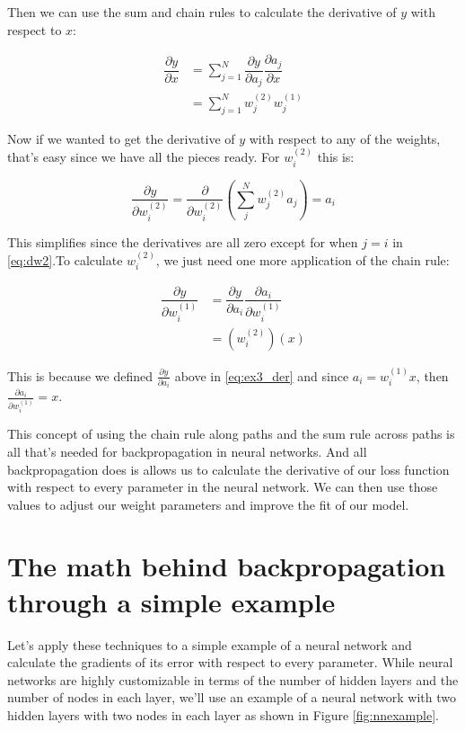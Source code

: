 \documentclass{article}
\begin{document}
Then we can use the sum and chain rules to calculate the derivative of $y$ with respect to $x$:

\begin{align}
    \dfrac{\partial y}{\partial x} &= \sum\limits_{j=1}^N  \dfrac{\partial y}{\partial a_j} \dfrac{\partial a_j}{\partial x} \label{eq:ex3_der}\\
    &= \sum\limits_{j=1}^N w_j^{(2)} w_j^{(1)}
\end{align}

Now if we wanted to get the derivative of $y$ with respect to any of the weights, that's easy since we have all the pieces ready. For $w_i^{(2)}$ this is:

\begin{equation}
    \dfrac{\partial y}{\partial w_i^{(2)}} = \dfrac{\partial}{\partial w_i^{(2)}}  \left(\sum\limits_j^N w_j^{(2)} a_j \right) = a_i
    \label{eq:dw2}
\end{equation}

This simplifies since the derivatives are all zero except for when $j=i$ in \ref{eq:dw2}.To calculate $w_i^{(2)}$, we just need one more application of the chain rule:

\begin{align}
    \dfrac{\partial y}{\partial w_i^{(1)}} &= \dfrac{\partial y}{\partial a_i} \dfrac{\partial a_i}{\partial w_i^{(1)}} \\
    &= (w_i^{(2)})(x)
\end{align}

This is because we defined $\frac{\partial y}{\partial a_i}$ above in \ref{eq:ex3_der} and since $a_i = w_i^{(1)} x$, then $\frac{\partial a_i}{\partial w_i^{(1)}} = x$.

This concept of using the chain rule along paths and the sum rule across paths is all that's needed for backpropagation in neural networks. And all backpropagation does is allows us to calculate the derivative of our loss function with respect to every parameter in the neural network. We can then use those values to adjust our weight parameters and improve the fit of our model.

\section{The math behind backpropagation through a simple example}

Let's apply these techniques to a simple example of a neural network and calculate the gradients of its error with respect to every parameter. While neural networks are highly customizable in terms of the number of hidden layers and the number of nodes in each layer, we'll use an example of a neural network with two hidden layers with two nodes in each layer as shown in Figure \ref{fig:nnexample}.
\end{document}
